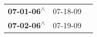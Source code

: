 \begin{supertabular}{lll}
 \textbf{07-01-06\textsuperscript{$\wedge$}} &  07-18-09\textsuperscript{} \\
 \textbf{07-02-06\textsuperscript{$\wedge$}} &  07-19-09\textsuperscript{} \\
\end{supertabular}
